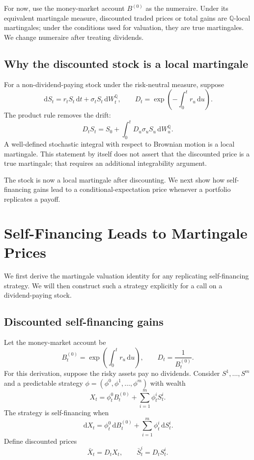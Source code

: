 \documentclass[10pt]{article}
\newcommand{\Q}{\mathbb Q}
\newcommand{\1}{\mathbf 1}
\newcommand{\dd}{\,\mathrm d}
\theoremstyle{definition}
\begin{document}
For now, use the money-market account \(B^{(0)}\) as the numeraire. Under
its equivalent martingale measure, discounted traded prices or total
gains are \(\Q\)-local martingales; under the conditions used for
valuation, they are true martingales. We change numeraire after treating
dividends.

\subsection{Why the discounted stock is a local martingale}

For a non-dividend-paying stock under the risk-neutral measure, suppose
\[
\dd S_t=r_tS_t\dd t+\sigma_tS_t\dd W_t^\Q,
\qquad
D_t=\exp\left(-\int_0^t r_u\dd u\right).
\]
The product rule removes the drift:
\[
\boxed{
D_tS_t=S_0+\int_0^tD_u\sigma_uS_u\dd W_u^\Q.}
\]
A well-defined stochastic integral with respect to Brownian motion is a
local martingale. This statement by itself does not assert that the
discounted price is a true martingale; that requires an additional
integrability argument.

The stock is now a local martingale after discounting. We next show how
self-financing gains lead to a conditional-expectation price whenever a
portfolio replicates a payoff.

\section{Self-Financing Leads to Martingale Prices}

We first derive the martingale valuation identity for any replicating
self-financing strategy. We will then construct such a strategy explicitly
for a call on a dividend-paying stock.

\subsection{Discounted self-financing gains}

Let the money-market account be
\[
B_t^{(0)}=\exp\left(\int_0^t r_u\dd u\right),
\qquad
D_t=\frac{1}{B_t^{(0)}}.
\]
For this derivation, suppose the risky assets pay no dividends. Consider
\(S^1,\ldots,S^m\) and a predictable strategy
\(\phi=(\phi^0,\phi^1,\ldots,\phi^m)\) with wealth
\[
X_t=\phi_t^0B_t^{(0)}+\sum_{i=1}^m\phi_t^iS_t^i.
\]
The strategy is self-financing when
\[
\dd X_t=\phi_t^0\dd B_t^{(0)}
        +\sum_{i=1}^m\phi_t^i\dd S_t^i.
\]
Define discounted prices
\[
\bar X_t=D_tX_t,
\qquad
\bar S_t^i=D_tS_t^i.
\]
\end{document}
